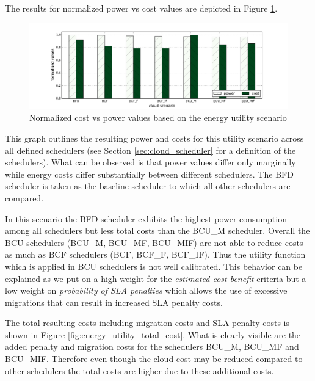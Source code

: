 The results for normalized power vs cost values are depicted in Figure \ref{fig:energy_utility_power_vs_cost}. 

\begin{figure}[htbp]
	\centering
		\includegraphics[width=1.00\textwidth]{figures/evaluation_and_results/energy_utility_power_vs_cost.pdf}
	\caption{Normalized cost vs power values based on the energy utility scenario}
	\label{fig:energy_utility_power_vs_cost}
\end{figure}

This graph outlines the resulting power and costs for this utility scenario across all defined schedulers (see Section \ref{sec:cloud_scheduler} for a definition of the schedulers). What can be observed is that power values differ only marginally while energy costs differ substantially between different schedulers. The BFD scheduler is taken as the baseline scheduler to which all other schedulers are compared. 

In this scenario the BFD scheduler exhibits the highest power consumption among all schedulers but less total costs than the BCU\_M scheduler. Overall the BCU schedulers (BCU\_M, BCU\_MF, BCU\_MIF) are not able to reduce costs as much as BCF schedulers (BCF, BCF\_F, BCF\_IF). Thus the utility function which is applied in BCU schedulers is not well calibrated. This behavior can be explained as we put on a high weight for the \textit{estimated cost benefit} criteria but a low weight on \textit{probability of SLA penalties} which allows the use of excessive migrations that can result in increased SLA penalty costs. 

The total resulting costs including migration costs and SLA penalty costs is shown in Figure \ref{fig:energy_utility_total_cost}. 
What is clearly visible are the added penalty and migration costs for the schedulers BCU\_M, BCU\_MF and BCU\_MIF. Therefore even though the cloud cost may be reduced compared to other schedulers the total costs are higher due to these additional costs. 

